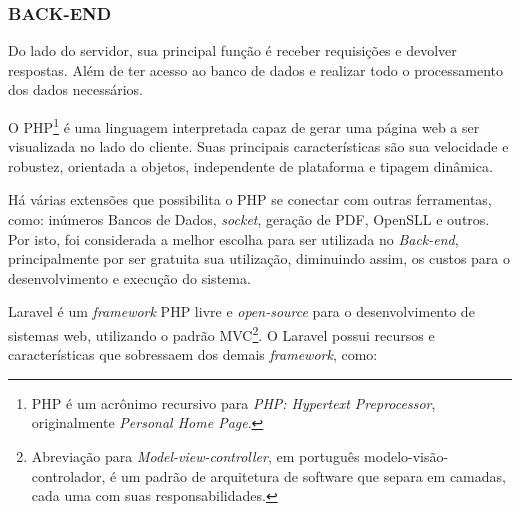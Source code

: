 \documentclass[
  12pt,				%
  openany,
  oneside,
  a4paper,			%
  english,			%
  brazil
]{article}
\numberwithin{figure}{section}
\numberwithin{table}{section}
\newcounter{subsubsubsection}[subsubsection]
\begin{document}
\subsubsection{BACK-END}
Do lado do servidor, sua principal função é receber requisições e devolver respostas. Além de ter acesso ao banco de dados e realizar todo o processamento dos dados necessários.

O PHP\footnote{PHP é um acrônimo recursivo para \textit{PHP: Hypertext Preprocessor}, originalmente \textit{Personal Home Page}.} é uma linguagem interpretada capaz de gerar uma página web a ser visualizada no lado do cliente. Suas principais características são sua velocidade e robustez, orientada a objetos, independente de plataforma e tipagem dinâmica. 

Há várias extensões que possibilita o PHP se conectar com outras ferramentas, como: inúmeros Bancos de Dados, \textit{socket}, geração de PDF, OpenSLL e outros. Por isto, foi considerada a melhor escolha para ser utilizada no \textit{Back-end}, principalmente por ser gratuita sua utilização, diminuindo assim, os custos para o desenvolvimento e execução do sistema.



Laravel é um \textit{framework} PHP livre e \textit{open-source} para o desenvolvimento de sistemas web, utilizando o padrão MVC\footnote{Abreviação para \textit{Model-view-controller}, em português modelo-visão-controlador, é um padrão de arquitetura de software que separa em camadas, cada uma com suas responsabilidades.}. O Laravel possui recursos e características que sobressaem dos demais \textit{framework}, como: 
\end{document}
